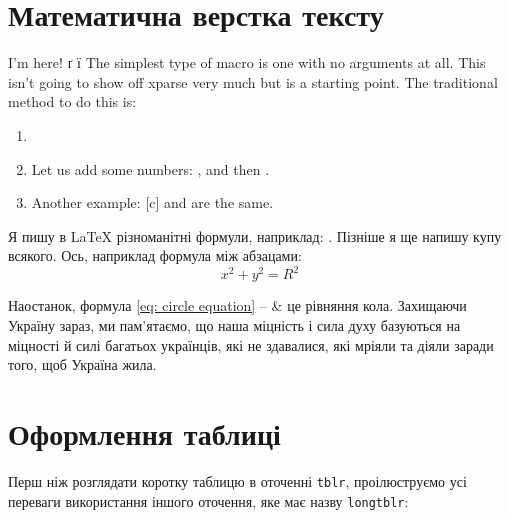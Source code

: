 \documentclass[14pt]{extarticle}
\begin{document}
\section*{Математична верстка тексту}

I'm here! ґ ї The simplest type of macro is one with no arguments at all. This isn’t going to show off xparse very much but is a starting point. The traditional method to do this is: 

\begin{enumerate}[label=($\bigstar$)]
    \item \NoArguments
    \item Let us add some numbers: , and then .
    \item Another example: [c] and  are the same.
\end{enumerate}

Я пишу в \LaTeX{} різноманітні формули, наприклад: . Пізніше я ще напишу купу всякого. Ось, наприклад формула між абзацами:
\begin{equation}\label{eq: circle equation}
    x^2 + y^2 = R^2
\end{equation}

Наостанок, формула \eqref{eq: circle equation} -- \& це рівняння кола. Захищаючи Україну зараз, ми па\-м'ятаємо, що наша міцність і сила духу базуються на міцності й силі багатьох українців, які не здавалися, які мріяли та діяли заради того, щоб Україна жила.

\section*{Оформлення таблиці}

Перш ніж розглядати коротку таблицю в оточенні \texttt{tblr}, проілюструємо усі переваги використання іншого оточення, яке має назву \texttt{longtblr}: 

\end{document}
